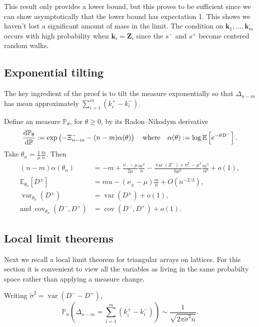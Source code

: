 \documentclass[draft]{scrartcl}
\newcommand{\E}{\mathbb E}
\newcommand{\littleo}{o}
\newcommand{\bigo}{O}
\newcommand{\defeq}{:=}
\newcommand{\vect}{\mathbf}
\renewcommand{\Pr}{\mathbb P}
\DeclareMathOperator{\var}{var}
\DeclareMathOperator{\cov}{cov}
\newcommand{\biasvar}{\var(Z^-)}
\newcommand{\diffsd}{\tilde{\sigma}}
\begin{document}
This result only provides a lower bound, but this proves to be sufficient since we can show asymptotically that the lower bound has expectation 1. This shows we haven't lost a significant amount of mass in the limit. The condition on $\vect{k}_1, \ldots, \vect{k}_m$ occurs with high probability when $\vect{k}_i = \vect{Z}_i$ since the $s^-$ and $s^+$ become centered random walks.

\subsection{Exponential tilting}

The key ingredient of the proof is to tilt the measure exponentially so that $\Delta_{n-m}$ has mean approximately $\sum_{i=1}^m (k^+_i - k^-_i)$.

\begin{lemma}
    Define an measure $\Pr_{\theta}$, for $\theta \geq 0$, by its Radon--Nikodym derivative
    \begin{equation}
        \diff{\Pr_{\theta}}{\Pr} \defeq \exp\left( - \Xi^-_{n-m} - (n-m) \alpha(\theta) \right)
        \quad \text{where} \quad
        \alpha(\theta) \defeq \log \E \left[ e^{-\theta D^-} \right].
    \end{equation}
    Take $\theta_n = \frac{1}{\mu} \frac{m}{n}$. Then
    \begin{align}
        (n-m)\alpha(\theta_n) &= -m + \frac{\nu_- - \mu}{2 \mu} \frac{m^2}{n} - \frac{\biasvar + \nu_-^2 - \mu^2}{6 \mu^2} \frac{m^3}{n^2} + \littleo(1), \\
        \E_{\theta_n}[D^{\pm}] &= mu - (\nu_{\pm} - \mu) \frac{m}{n} + \bigo(n^{-2/3}), \\
        \var_{\theta_n}(D^{\pm}) &= \var(D^{\pm}) + \littleo(1), \\
        \text{and}\ \cov_{\theta_n}(D^-, D^+) &= \cov(D^-, D^+) + \littleo(1).
    \end{align}
\end{lemma}

\subsection{Local limit theorems}

Next we recall a local limit theorem for triangular arrays on lattices. For this section it is convenient to view all the variables as living in the same probabilty space rather than applying a measure change.

\begin{lemma}
    Writing $\diffsd^2 = \var(D^- - D^+)$, 
    \begin{equation}
        \Pr_n\left( \Delta_{n-m} = \sum_{i=1}^m (k^+_i - k^-_i) \right) \sim \frac{1}{\sqrt{2 \pi \diffsd^2 n}}.
    \end{equation}
\end{lemma}
\end{document}
